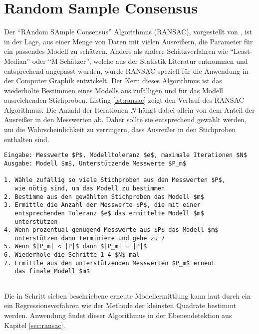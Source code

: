 \section{Random Sample Consensus} \label{sec:ransac-theory}

Der \enquote{RAndom SAmple Consensus} Algorithmus (RANSAC), vorgestellt von \citet{fischler1981random}, ist in der Lage, aus einer Menge von Daten mit vielen Ausreißern, die Parameter für ein passendes Modell zu schätzen. Anders als andere Schätzverfahren wie \enquote{Least-Median} oder \enquote{M-Schätzer}, welche aus der Statistik Literatur entnommen und entsprechend angepasst wurden, wurde RANSAC speziell für die Anwendung in der Computer Graphik entwickelt. Der Kern dieses Algorithmus ist das wiederholte Bestimmen eines Modells aus zufälligen und für das Modell ausreichenden Stichproben. Listing \ref{lst:ransac} zeigt den Verlauf des RANSAC Algorithmus. Die Anzahl der Iterationen \(N\) hängt dabei allein von dem Anteil der Ausreißer in den Messwerten ab. Daher sollte sie entsprechend gewählt werden, um die Wahrscheinlichkeit zu verringern, dass Ausreißer in den Stichproben enthalten sind. \citep{derpanis2010overview} \\

\begin{lstlisting}[mathescape,caption=Der RANSAC Algorithmus, label=lst:ransac, float=htbp]
Eingabe: Messwerte $P$, Modelltoleranz $e$, maximale Iterationen $N$
Ausgabe: Modell $m$, Unterstützende Messwerte $P_m$

1. Wähle zufällig so viele Stichproben aus den Messwerten $P$,
   wie nötig sind, um das Modell zu bestimmen
2. Bestimme aus den gewählten Stichproben das Modell $m$
3. Ermittle die Anzahl der Messwerte $P$, die mit einer 
   entsprechenden Toleranz $e$ das ermittelte Modell $m$ 
   unterstützen
4. Wenn prozentual genügend Messwerte aus $P$ das Modell $m$ 
   unterstützen dann terminiere und gehe zu 7
5. Wenn $|P_m| < |P|$ dann $|P_m| = |P|$
6. Wiederhole die Schritte 1-4 $N$ mal
7. Ermittle aus den unterstützenden Messwerten $P_m$ erneut 
   das finale Modell $m$
   
\end{lstlisting} 

Die in Schritt sieben beschriebene erneute Modellermittlung kann laut \citet{fischler1981random} durch ein ein Regressionsverfahren wie der Methode der kleinsten Quadrate bestimmt werden. Anwendung findet dieser Algorithmus in der Ebenendetektion aus Kapitel \ref{sec:ransac}.